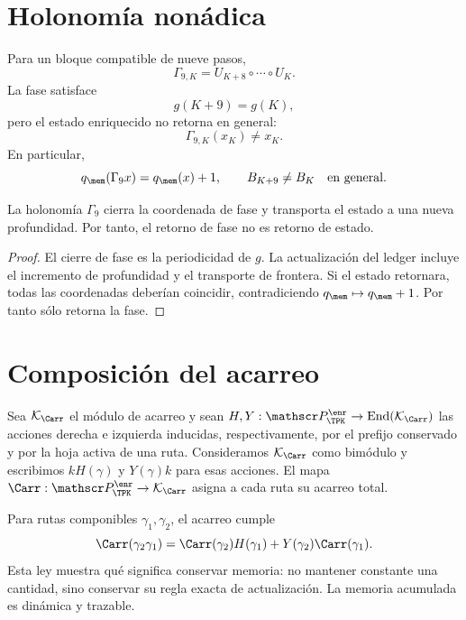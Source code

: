 \section{Holonomía nonádica}

Para un bloque compatible de nueve pasos,
\begin{equation}
 \Gamma_{9,K}=U_{K+8}\circ\cdots\circ U_K.
 \label{espiral:eq:gamma9-def}
\end{equation}
La fase satisface
\[
 g(K+9)=g(K),
\]
pero el estado enriquecido no retorna en general:
\[
 \Gamma_{9,K}(x_K)\neq x_K.
\]
En particular,
\[
 q_{\mem}(\Gamma_9x)=q_{\mem}(x)+1,
 \qquad B_{K+9}\neq B_K\quad\text{en general}.
\]

\begin{theorem}
La holonomía \(\Gamma_9\) cierra la coordenada de fase y transporta el
estado a una nueva profundidad. Por tanto, el retorno de fase no es retorno
de estado.
\end{theorem}
\begin{proof}
El cierre de fase es la periodicidad de \(g\). La actualización del ledger
incluye el incremento de profundidad y el transporte de frontera. Si el
estado retornara, todas las coordenadas deberían coincidir, contradiciendo
\(q_{\mem}\mapsto q_{\mem}+1\). Por tanto sólo retorna la fase.
\end{proof}

\section{Composición del acarreo}

Sea \(\mathcal K_{\Carr}\) el módulo de acarreo y sean
\(H,Y:\mathscr P_{\TPK}^{\enr}\to\operatorname{End}(\mathcal K_{\Carr})\)
las acciones derecha e izquierda inducidas, respectivamente, por el prefijo
conservado y por la hoja activa de una ruta. Consideramos
\(\mathcal K_{\Carr}\) como bimódulo y escribimos
\(kH(\gamma)\) y \(Y(\gamma)k\) para esas acciones. El mapa
\(\Carr:\mathscr P_{\TPK}^{\enr}\to\mathcal K_{\Carr}\) asigna a cada ruta
su acarreo total.

Para rutas componibles \(\gamma_1,\gamma_2\), el acarreo cumple
\begin{equation}
 \Carr(\gamma_2\gamma_1)
 =\Carr(\gamma_2)H(\gamma_1)
 +Y(\gamma_2)\Carr(\gamma_1).
 \label{espiral:eq:cociclo-carry}
\end{equation}
Esta ley muestra qué significa conservar memoria: no mantener constante una
cantidad, sino conservar su regla exacta de actualización. La memoria
acumulada es dinámica y trazable.

